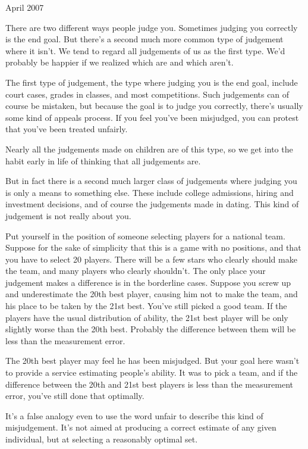April 2007

There are two different ways people judge you. Sometimes judging you
correctly is the end goal. But there's a second much more common type of
judgement where it isn't. We tend to regard all judgements of us as the
first type. We'd probably be happier if we realized which are and which
aren't.

The first type of judgement, the type where judging you is the end goal,
include court cases, grades in classes, and most competitions. Such
judgements can of course be mistaken, but because the goal is to judge
you correctly, there's usually some kind of appeals process. If you feel
you've been misjudged, you can protest that you've been treated
unfairly.

Nearly all the judgements made on children are of this type, so we get
into the habit early in life of thinking that all judgements are.

But in fact there is a second much larger class of judgements where
judging you is only a means to something else. These include college
admissions, hiring and investment decisions, and of course the
judgements made in dating. This kind of judgement is not really about
you.

Put yourself in the position of someone selecting players for a national
team. Suppose for the sake of simplicity that this is a game with no
positions, and that you have to select 20 players. There will be a few
stars who clearly should make the team, and many players who clearly
shouldn't. The only place your judgement makes a difference is in the
borderline cases. Suppose you screw up and underestimate the 20th best
player, causing him not to make the team, and his place to be taken by
the 21st best. You've still picked a good team. If the players have the
usual distribution of ability, the 21st best player will be only
slightly worse than the 20th best. Probably the difference between them
will be less than the measurement error.

The 20th best player may feel he has been misjudged. But your goal here
wasn't to provide a service estimating people's ability. It was to pick
a team, and if the difference between the 20th and 21st best players is
less than the measurement error, you've still done that optimally.

It's a false analogy even to use the word unfair to describe this kind
of misjudgement. It's not aimed at producing a correct estimate of any
given individual, but at selecting a reasonably optimal set.

